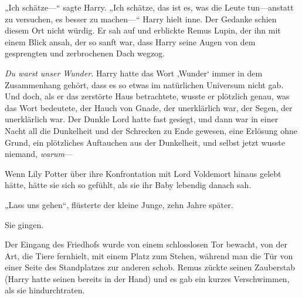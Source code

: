 „Ich schätze—“ sagte Harry. „Ich schätze, das ist es, was die Leute tun—anstatt zu versuchen, es besser zu machen—“ Harry hielt inne. Der Gedanke schien diesem Ort nicht würdig. Er sah auf und erblickte Remus Lupin, der ihn mit einem Blick ansah, der so sanft war, dass Harry seine Augen von dem gesprengten und zerbrochenen Dach wegzog.

\emph{Du warst unser Wunder.} Harry hatte das Wort ‚Wunder‘ immer in dem Zusammenhang gehört, dass es so etwas im natürlichen Universum nicht gab. Und doch, als er das zerstörte Haus betrachtete, wusste er plötzlich genau, was das Wort bedeutete, der Hauch von Gnade, der unerklärlich war, der Segen, der unerklärlich war. Der Dunkle Lord hatte fast gesiegt, und dann war in einer Nacht all die Dunkelheit und der Schrecken zu Ende gewesen, eine Erlösung ohne Grund, ein plötzliches Auftauchen aus der Dunkelheit, und selbst jetzt wusste niemand, \emph{warum}—

Wenn Lily Potter über ihre Konfrontation mit Lord Voldemort hinaus gelebt hätte, hätte sie sich so gefühlt, als sie ihr Baby lebendig danach sah.

„Lass uns gehen“, flüsterte der kleine Junge, zehn Jahre später.

Sie gingen.

Der Eingang des Friedhofs wurde von einem schlosslosen Tor bewacht, von der Art, die Tiere fernhielt, mit einem Platz zum Stehen, während man die Tür von einer Seite des Standplatzes zur anderen schob. Remus zückte seinen Zauberstab (Harry hatte seinen bereits in der Hand) und es gab ein kurzes Verschwimmen, als sie hindurchtraten.

